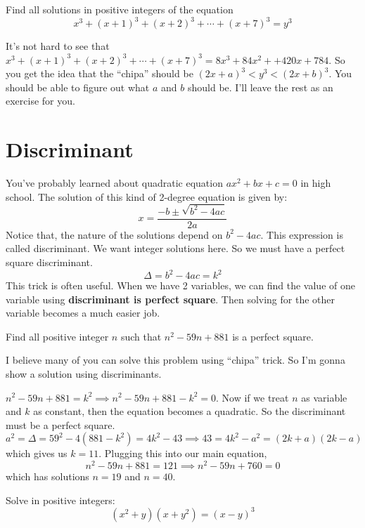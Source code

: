 \documentclass[11pt]{scrartcl}
\begin{document}
\begin{exercise}
Find all solutions in positive integers of the equation
\[
x^{3}+(x+1)^{3}+(x+2)^{3}+\cdots+(x+7)^{3}=y^{3}
\]
\end{exercise}
\begin{soln}
It's not hard to see that \(x^{3}+(x+1)^{3}+(x+2)^{3}+\cdots+(x+7)^{3} = 8x^3 + 84x^2 + +420x + 784\). So you get the idea that the ``chipa'' should be \((2x+a)^3 < y^3 < (2x+b)^3\). You should be able to figure out what \(a\) and \(b\) should be. I'll leave the rest as an exercise for you.
\end{soln}

\section{Discriminant}
You've probably learned about quadratic equation \(ax^2 + bx + c =0\) in high school. The solution of this kind of 2-degree equation is given by:
\[x = \frac{-b \pm \sqrt{b^2-4ac}}{2a}\]
Notice that, the nature of the solutions depend on \(b^2-4ac\). This expression is called discriminant. We want integer solutions here. So we must have a perfect square discriminant. \[\Delta = b^2 -4ac = k^2\]
This trick is often useful. When we have 2 variables, we can find the value of one variable using \textbf{discriminant is perfect square}. Then solving for the other variable becomes a much easier job.
\begin{exercise}
Find all positive integer \(n\) such that \(n^2 - 59n + 881\) is a perfect square.
\end{exercise}
I believe many of you can solve this problem using ``chipa'' trick. So I'm gonna show a solution using discriminants.
\begin{soln}
\(n^2 - 59n + 881 = k^2 \implies n^2 - 59n + 881 - k^2 =0\). Now if we treat \(n\) as variable and \(k\) as constant, then the equation becomes a quadratic. So the discriminant must be a perfect square.
\[a^2 = \Delta = 59^2 - 4 (881-k^2) = 4k^2 - 43 \implies 43= 4k^2 - a^2 = (2k+a)(2k-a)\]
which gives us \(k=11\). Plugging this into our main equation, 
\[n^2 - 59n + 881 = 121 \implies n^2 - 59n +760 = 0\]
which has solutions \(n=19\) and \(n=40\).
\end{soln}
\begin{exercise}
Solve in positive integers:
\[(x^2+y)(x+y^2)=(x−y)^3\]
\end{exercise}
\end{document}
